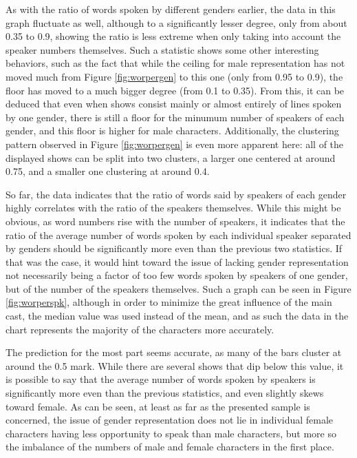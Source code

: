 \documentclass[a4paper, 11pt]{article}
\begin{document}
As with the ratio of words spoken by different genders earlier, the data in this graph fluctuate as well, although to a significantly lesser degree, only from about 0.35 to 0.9, showing the ratio is less extreme when only taking into account the speaker numbers themselves. Such a statistic shows some other interesting behaviors, such as the fact that while the ceiling for male representation has not moved much from Figure \ref{fig:worpergen} to this one (only from 0.95 to 0.9), the floor has moved to a much bigger degree (from 0.1 to 0.35). From this, it can be deduced that even when shows consist mainly or almost entirely of lines spoken by one gender, there is still a floor for the minumum number of speakers of each gender, and this floor is higher for male characters. Additionally, the clustering pattern observed in Figure \ref{fig:worpergen} is even more apparent here: all of the displayed shows can be split into two clusters, a larger one centered at around 0.75, and a smaller one clustering at around 0.4.

So far, the data indicates that the ratio of words said by speakers of each gender highly correlates with the ratio of the speakers themselves. While this might be obvious, as word numbers rise with the number of speakers, it indicates that the ratio of the average number of words spoken by each individual speaker separated by genders should be significantly more even than the previous two statistics. If that was the case, it would hint toward the issue of lacking gender representation not necessarily being a factor of too few words spoken by speakers of one gender, but of the number of the speakers themselves. Such a graph can be seen in Figure \ref{fig:worperspk}, although in order to minimize the great influence of the main cast, the median value was used instead of the mean, and as such the data in the chart represents the majority of the characters more accurately.

The prediction for the most part seems accurate, as many of the bars cluster at around the 0.5 mark. While there are several shows that dip below this value, it is possible to say that the average number of words spoken by speakers is significantly more even than the previous statistics, and even slightly skews toward female. As can be seen, at least as far as the presented sample is concerned, the issue of gender representation does not lie in individual female characters having less opportunity to speak than male characters, but more so the imbalance of the numbers of male and female characters in the first place.
\end{document}
